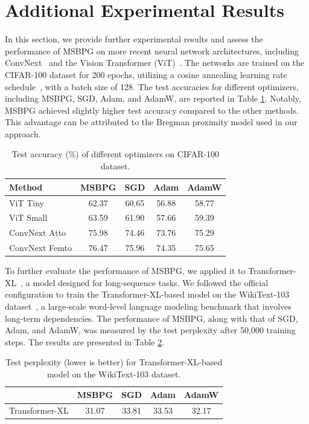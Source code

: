 \documentclass[twoside,11pt]{article}
\begin{document}
\section{Additional Experimental Results}
\label{appendix:additional exp}
{In this section, we provide further experimental results and assess the performance of MSBPG on more recent neural network architectures, including ConvNext~\citep{liu2022convnet} and the Vision Transformer (ViT)~\citep{dosovitskiy2020image}. The networks are trained on the CIFAR-100 dataset for 200 epochs, utilizing a cosine annealing learning rate schedule~\citep{loshchilov2016sgdr}, with a batch size of 128. The test accuracies for different optimizers, including MSBPG, SGD, Adam, and AdamW, are reported in Table \ref{tab:test_acc}. Notably, MSBPG achieved slightly higher test accuracy compared to the other methods. This advantage can be attributed to the Bregman proximity model used in our approach.
\begin{table}[ht]
\centering
\begin{tabular}{l|c|c|c|c}
\hline
Method & MSBPG & SGD & Adam & AdamW \\ \hline 
ViT Tiny & 62.37 & 60.65 & 56.88 & 58.77 \\ \hline
ViT Small & 63.59 & 61.90 & 57.66 & 59.39 \\ \hline
ConvNext Atto & 75.98 & 74.46 & 73.76 & 75.29 \\ \hline
ConvNext Femto & 76.47 & 75.96 & 74.35 & 75.65 \\ \hline
\end{tabular}
\caption{Test accuracy (\%) of different optimizers on CIFAR-100 dataset.}
\label{tab:test_acc}
\end{table}

To further evaluate the performance of MSBPG, we applied it to Transformer-XL~\citep{dai2019transformer}, a model designed for long-sequence tasks. We followed the official configuration to train the Transformer-XL-based model on the WikiText-103 dataset~\citep{merity2016pointer}, a large-scale word-level language modeling benchmark that involves long-term dependencies. The performance of MSBPG, along with that of SGD, Adam, and AdamW, was measured by the test perplexity after 50,000 training steps. The results are presented in Table \ref{tab:transformer_ppl}. 

\begin{table}[ht]
\centering
\begin{tabular}{l|c|c|c|c}
\hline
 & MSBPG & SGD & Adam & AdamW \\ \hline 
Transformer-XL & 31.07 & 33.81 & 33.53 & 32.17 \\ \hline
\end{tabular}
\caption{Test perplexity (lower is better) for Transformer-XL-based model on the WikiText-103 dataset.}
\label{tab:transformer_ppl}
\end{table}

}
\end{document}
